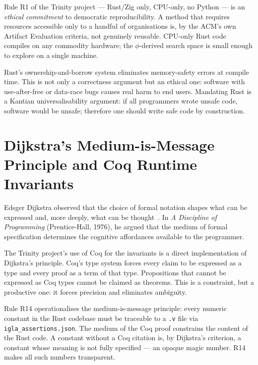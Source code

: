 Rule R1 of the Trinity project — Rust/Zig only, CPU-only, no Python — is an
\emph{ethical commitment} to democratic reproducibility.  A method that requires
resources accessible only to a handful of organisations is, by the ACM's own
Artifact Evaluation criteria, not genuinely reusable.  CPU-only Rust code
compiles on any commodity hardware; the \(\phi\)-derived search space is
small enough to explore on a single machine.

Rust's ownership-and-borrow system eliminates memory-safety errors at
compile time.  This is not only a correctness argument but an ethical one:
software with use-after-free or data-race bugs causes real harm to end users.
Mandating Rust is a Kantian universalisability argument: if all programmers
wrote unsafe code, software would be unsafe; therefore one should write safe
code by construction.

\section{Dijkstra's Medium-is-Message Principle and Coq Runtime Invariants}
\label{sec:phd31-dijkstra}

Edsger Dijkstra observed that the choice of formal notation shapes what can be
expressed and, more deeply, what can be thought~\cite{dijkstra_discipline}.
In \emph{A Discipline of Programming} (Prentice-Hall, 1976), he argued that
the medium of formal specification determines the cognitive affordances
available to the programmer.

The Trinity project's use of Coq for the invariants is a direct implementation
of Dijkstra's principle.  Coq's type system forces every claim to be expressed
as a type and every proof as a term of that type.  Propositions that cannot
be expressed as Coq types cannot be claimed as theorems.  This is a constraint,
but a productive one: it forces precision and eliminates ambiguity.

Rule R14 operationalises the medium-is-message principle: every numeric constant
in the Rust codebase must be traceable to a \texttt{.v} file via
\texttt{igla\_assertions.json}.  The medium of the Coq proof constrains the
content of the Rust code.  A constant without a Coq citation is, by Dijkstra's
criterion, a constant whose meaning is not fully specified — an opaque magic
number.  R14 makes all such numbers transparent.

